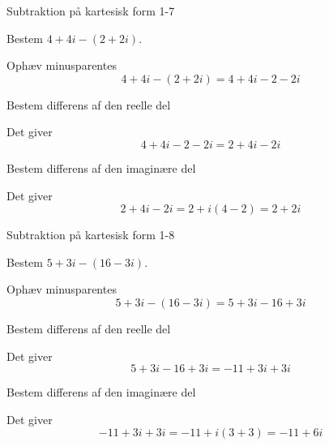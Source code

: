 \documentclass{article}
\begin{document}
\newpage

\begin{exercise}{Subtraktion på kartesisk form 1-7}
	
	Bestem $4+4i-(2+2i)$.
	
	
	\hint
	
	Ophæv minusparentes
	\[
	4+4i-(2+2i) = 4 + 4i - 2 -2i
	\]
	
	\hint
	
	Bestem differens af den reelle del
	
	\hint
	
	Det giver
	\[
	4 + 4i - 2 -2i = 2 + 4i - 2i
	\]
	
	\hint
	
	Bestem differens af den imaginære del 
	
	
	\hint
	
	Det giver 
	\[
	2 + 4i - 2i = 2 + i(4-2) = 2 + 2i
 	\]
	
\end{exercise}

\newpage

\begin{exercise}{Subtraktion på kartesisk form 1-8}
	
	Bestem $5+3i - (16 - 3i)$.
	
	
	\hint
	
	Ophæv minusparentes
	\[
	5+3i - (16 - 3i) = 	5 + 3i - 16 + 3i
	\]
	
	\hint
	
	Bestem differens af den reelle del
	
	\hint
	
	Det giver
	\[
	5 + 3i - 16 + 3i = - 11 + 3i + 3i
	\]
	
	\hint
	
	Bestem differens af den imaginære del 
	
	
	\hint
	
	Det giver 
	\[
	- 11 + 3i + 3i = -11 +i(3+3) = -11 + 6i
	\]
	
\end{exercise}
\end{document}
